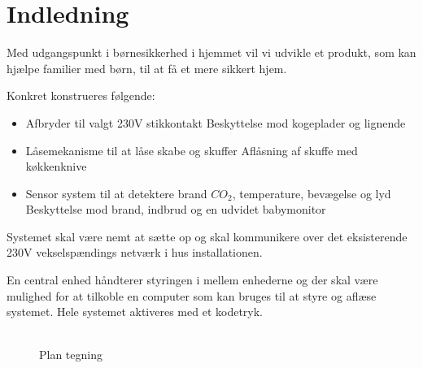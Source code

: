 \chapter{Indledning}

Med udgangspunkt i børnesikkerhed i hjemmet vil vi udvikle et produkt, som kan hjælpe familier med børn, til at få et mere sikkert hjem.

Konkret konstrueres følgende:

\begin{itemize}
\item Afbryder til valgt 230V stikkontakt
\subitem Beskyttelse mod kogeplader og lignende
\item Låsemekanisme til at låse skabe og skuffer
\subitem Aflåsning af skuffe med køkkenknive
\item Sensor system til at detektere brand $CO_2$, temperature, bevægelse og lyd
\subitem Beskyttelse mod brand, indbrud og en udvidet babymonitor
\end{itemize}

Systemet skal være nemt at sætte op og skal kommunikere over det eksisterende 230V vekselspændings netværk i hus installationen.

En central enhed håndterer styringen i mellem enhederne og der skal være mulighed for at tilkoble en computer som kan bruges til at styre og aflæse systemet. Hele systemet aktiveres med et kodetryk.
\\
\\
\begin{figure}[h] \centering
{}
\caption{Plan tegning}
\label{lab:plantegning}
\end{figure}
